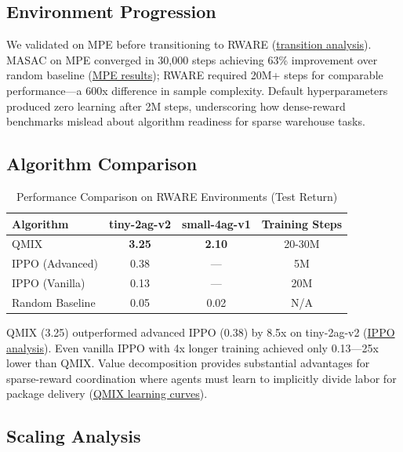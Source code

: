 \documentclass[11pt]{article}
\begin{document}
\subsection{Environment Progression}

We validated on MPE before transitioning to RWARE (\href{https://pallman14.github.io/MARL-QMIX-Warehouse-Robots/salmon/week2.html}{transition analysis}). MASAC on MPE converged in 30,000 steps achieving 63\% improvement over random baseline (\href{https://pallman14.github.io/MARL-QMIX-Warehouse-Robots/lian/week1.html}{MPE results}); RWARE required 20M+ steps for comparable performance---a 600x difference in sample complexity. Default hyperparameters produced zero learning after 2M steps, underscoring how dense-reward benchmarks mislead about algorithm readiness for sparse warehouse tasks.

\subsection{Algorithm Comparison}

\begin{table}[H]
\centering
\small
\caption{Performance Comparison on RWARE Environments (Test Return)}
\begin{tabular}{lccc}
\toprule
Algorithm & tiny-2ag-v2 & small-4ag-v1 & Training Steps \\
\midrule
QMIX & \textbf{3.25} & \textbf{2.10} & 20-30M \\
IPPO (Advanced) & 0.38 & --- & 5M \\
IPPO (Vanilla) & 0.13 & --- & 20M \\
Random Baseline & 0.05 & 0.02 & N/A \\
\bottomrule
\end{tabular}
\end{table}

QMIX (3.25) outperformed advanced IPPO (0.38) by 8.5x on tiny-2ag-v2 (\href{https://pallman14.github.io/MARL-QMIX-Warehouse-Robots/price/week2.html}{IPPO analysis}). Even vanilla IPPO with 4x longer training achieved only 0.13---25x lower than QMIX. Value decomposition provides substantial advantages for sparse-reward coordination where agents must learn to implicitly divide labor for package delivery (\href{https://pallman14.github.io/MARL-QMIX-Warehouse-Robots/lian/week4.html}{QMIX learning curves}).

\subsection{Scaling Analysis}
\end{document}
